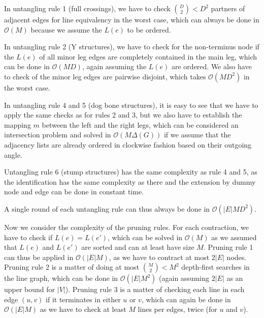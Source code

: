 \documentclass[format=acmsmall, review=false, screen=true]{acmart}
\begin{document}
In untangling rule 1 (full crossings), we have to check ${D \choose 2} < D^2$ partners of adjacent edges for line equivalency in the worst case, which can always be done in $\mathcal{O}(M)$ because we assume the $L(e)$ to be ordered.


In untangling rule 2 (Y structures), we have to check for the non-terminus node if the $L(e)$ of all minor leg edges are completely contained in the main leg, which can be done in $\mathcal{O}(MD)$, again assuming the $L(e)$ are ordered. We also have to check of the minor leg edges are pairwise disjoint, which takes $\mathcal{O}(MD^2)$ in the worst case. 


In untangling rule 4 and 5 (dog bone structures), it is easy to see that we have to apply the same checks as for rules 2 and 3, but we also have to establish the mapping $m$ between the left and the right legs, which can be considered an intersection problem and solved in $\mathcal{O}(M\Delta(G))$ if we assume that the adjacency lists are already ordered in clockwise fashion based on their outgoing angle.

Untangling rule 6 (stump structures) has the same complexity as rule 4 and 5, as the identification has the same complexity as there and the extension by dummy node and edge can be done in constant time.

A single round of each untangling rule can thus always be done in $\mathcal{O}(|E|MD^2)$.

Now we consider the complexity of the pruning rules. For each contraction, we have to check if $L(e) = L(e')$, which can be solved in $\mathcal{O}(M)$ as we assumed that $L(e)$ and $L(e')$ are sorted and can at least have size $M$. Pruning rule 1 can thus be applied in $\mathcal{O}(|E|M)$, as we have to contract at most $2|E|$ nodes. Pruning rule 2 is a matter of doing at most ${M \choose 2} < M^2$ depth-first searches in the line graph, which can be done in $\mathcal{O}(|E|M^2)$ (again assuming $2|E|$ as an upper bound for $|V|$). Pruning rule 3 is a matter of checking each line in each edge $(u, v)$ if it terminates in either $u$ or $v$, which can again be done in $\mathcal{O}(|E|M)$ as we have to check at least $M$ lines per edges, twice (for $u$ and $v$).
\end{document}

